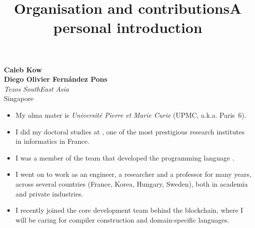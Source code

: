 \documentclass[wide]{slides}
\begin{document}
\maketitle

\begin{slide}
  \title{Organisation and contributions}

  \begin{center}
    \textbf{Caleb Kow}\\
    \textbf{Diego Olivier Fern\'andez Pons}\\
    \textit{Tezos SouthEast Asia}\\
    Singapore
  \end{center}

\end{slide}

\begin{slide}
  \title{A personal introduction}

  \begin{itemize}

    \item My alma mater is \emph{Universit\'e Pierre et Marie Curie}
      (UPMC, a.k.a. Paris~6).

    \item I did my doctoral studies at \Inria, one of the most
      prestigious research institutes in informatics in France.

    \item I was a member of the team that developed the programming
      language \OCaml.

    \item I went on to work as an engineer, a researcher and a
      professor for many years, across several countries (France,
      Korea, Hungary, Sweden), both in academia and private
      industries.

    \item I recently joined the core development team behind the
      \Tezos blockchain, where I will be caring for compiler
      construction and domain\hyp{}specific languages.

  \end{itemize}

\end{slide}
\end{document}
